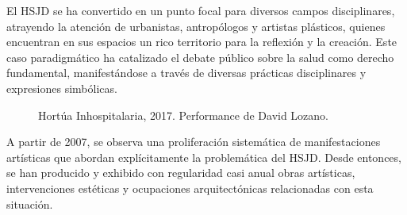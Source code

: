 El HSJD se ha convertido en un punto focal para diversos campos disciplinares, atrayendo la atención de urbanistas, antropólogos y artistas plásticos, quienes encuentran en sus espacios un rico territorio para la reflexión y la creación. Este caso paradigmático ha catalizado el debate público sobre la salud como derecho fundamental, manifestándose a través de diversas prácticas disciplinares y expresiones simbólicas.

\begin{figure}[p]
    \thispagestyle{empty}
    \captionsetup{labelformat=empty,textformat=empty}
    \caption{Hortúa Inhospitalaria, 2017. Performance de David Lozano.}
    \label{fig:david_lozano_hortua}
\end{figure}

A partir de 2007, se observa una proliferación sistemática de manifestaciones artísticas que abordan explícitamente la problemática del HSJD. Desde entonces, se han producido y exhibido con regularidad casi anual obras artísticas, intervenciones estéticas y ocupaciones arquitectónicas relacionadas con esta situación.

